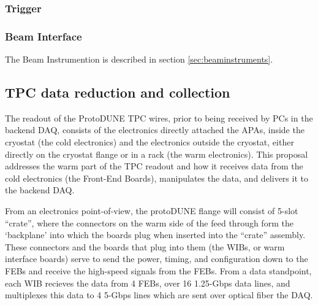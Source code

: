 \subsubsection{Trigger}


\subsubsection{Beam Interface}

The Beam Instrumention is described in section \ref{sec:beaminstruments}.

\subsection{TPC data reduction and collection}


The readout of the ProtoDUNE TPC wires, prior to being received by PCs in
the backend DAQ, consists of the electronics directly attached the APAs,
inside the cryostat (the cold electronics) and the electronics outside
the cryostat, either directly on the cryostat flange or in a rack (the
warm electronics).  This proposal addresses the warm part of the TPC
readout and how it receives data from the cold electronics (the Front-End
Boards), manipulates the data, and delivers it to the backend DAQ.

From an electronics point-of-view, the protoDUNE flange will consist of
5-slot ``crate'', where the connectors on the warm side of the feed
through form the ‘backplane’ into which the boards plug when inserted
into the ``crate'' assembly.  These connectors and the boards that plug
into them (the WIBs, or warm interface boards) serve to send the power,
timing, and configuration down to the FEBs and receive the high-speed
signals from the FEBs. From a data standpoint, each WIB recieves the
data from 4 FEBs, over 16 1.25-Gbps data lines, and multiplexes this
data to 4 5-Gbps lines which are sent over optical fiber the DAQ.

